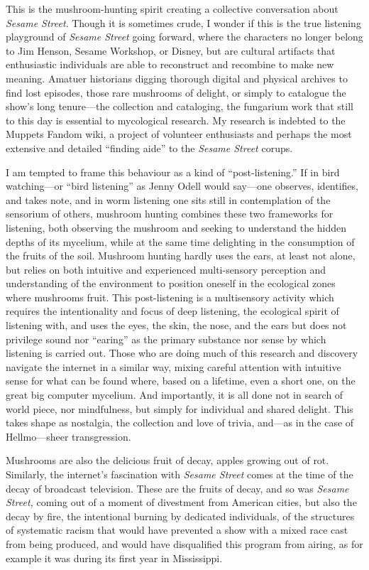 \documentclass[12pt,letterpaper]{article}
\newcommand{\ses}{\textit{Sesame Street }}
\begin{document}
	This is the mushroom-hunting spirit creating a collective conversation 
	about \textit{Sesame Street}. Though it is sometimes crude, I 
	wonder if this is the true listening playground of \ses going forward, 
	where the characters no longer belong to Jim Henson, Sesame Workshop, or
	Disney, but are cultural artifacts that enthusiastic individuals are 
	able to reconstruct and recombine to make new meaning. Amatuer 
	historians digging thorough digital and physical archives to find lost 
	episodes, those rare mushrooms of delight, or simply to catalogue the 
	show's long tenure---the collection and cataloging, the fungarium work 
	that still to this day is essential to mycological research. My research
	is indebted to the Muppets Fandom wiki, a project of volunteer 
	enthusiasts and perhaps the most extensive and detailed ``finding aide''
	to the \ses corups. 

	I am tempted to frame this behaviour as a kind of ``post-listening.'' If
	in bird watching---or ``bird listening'' as Jenny Odell would say---one
	observes, identifies, and takes note, and in worm listening one sits 
	still in contemplation of the sensorium of others, mushroom hunting 
	combines these two frameworks for listening, both observing the mushroom 
	and seeking to understand the hidden depths of its mycelium, while at 
	the same time delighting in the consumption of the fruits of the soil. 
	Mushroom hunting hardly uses the ears, at least not alone, but relies on
	both intuitive and experienced multi-sensory perception and 
	understanding of the environment to position oneself in the ecological 
	zones where mushrooms fruit. This post-listening is a multisensory 
	activity which requires the intentionality and focus of deep listening, 
	the ecological spirit of listening with, and uses the eyes, the 
	skin, the nose, and the ears but does not privilege sound nor ``earing''
	as the primary substance nor sense by which listening is carried out. 
	Those who are doing much of this research 
	and discovery navigate the internet in a similar way, mixing careful 
	attention with intuitive sense for what can be found where, based on a 
	lifetime, even a short one, on the great big computer mycelium. And
	importantly, it is all done not in search of world piece, nor 
	mindfulness, but simply for individual and shared delight. This takes
	shape as nostalgia, the collection and love of trivia, and---as in the
	case of Hellmo---sheer transgression.   

	Mushrooms are also the delicious fruit of decay, apples growing out of 
	rot. Similarly, the internet's fascination with \ses comes at 
	the time of the decay of broadcast television. These are the 
	fruits of decay, and so was \textit{Sesame Street,} coming out of a 
	moment of divestment from American cities, but also the decay by fire, 
	the intentional burning by dedicated individuals, of the structures of 
	systematic racism that would have prevented a show with a mixed race 
	cast from being produced, and would have disqualified this program from
	airing, as for example it was during its first year in 
	Mississippi.\autocite[201]{Davis} 
\end{document}
